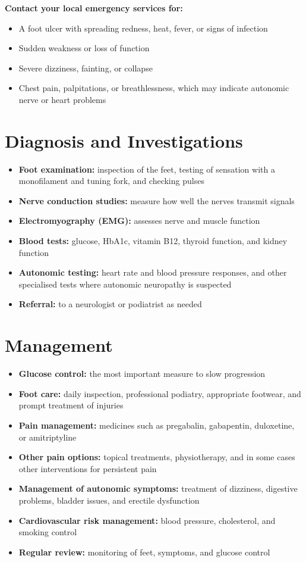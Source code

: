 \textbf{Contact your local emergency services for:}
\begin{itemize}
    \item A foot ulcer with spreading redness, heat, fever, or signs of infection
    \item Sudden weakness or loss of function
    \item Severe dizziness, fainting, or collapse
    \item Chest pain, palpitations, or breathlessness, which may indicate autonomic nerve or heart problems
\end{itemize}

\section*{Diagnosis and Investigations}
\begin{itemize}
    \item \textbf{Foot examination:} inspection of the feet, testing of sensation with a monofilament and tuning fork, and checking pulses
    \item \textbf{Nerve conduction studies:} measure how well the nerves transmit signals
    \item \textbf{Electromyography (EMG):} assesses nerve and muscle function
    \item \textbf{Blood tests:} glucose, HbA1c, vitamin B12, thyroid function, and kidney function
    \item \textbf{Autonomic testing:} heart rate and blood pressure responses, and other specialised tests where autonomic neuropathy is suspected
    \item \textbf{Referral:} to a neurologist or podiatrist as needed
\end{itemize}

\section*{Management}
\begin{itemize}
    \item \textbf{Glucose control:} the most important measure to slow progression
    \item \textbf{Foot care:} daily inspection, professional podiatry, appropriate footwear, and prompt treatment of injuries
    \item \textbf{Pain management:} medicines such as pregabalin, gabapentin, duloxetine, or amitriptyline
    \item \textbf{Other pain options:} topical treatments, physiotherapy, and in some cases other interventions for persistent pain
    \item \textbf{Management of autonomic symptoms:} treatment of dizziness, digestive problems, bladder issues, and erectile dysfunction
    \item \textbf{Cardiovascular risk management:} blood pressure, cholesterol, and smoking control
    \item \textbf{Regular review:} monitoring of feet, symptoms, and glucose control
\end{itemize}

